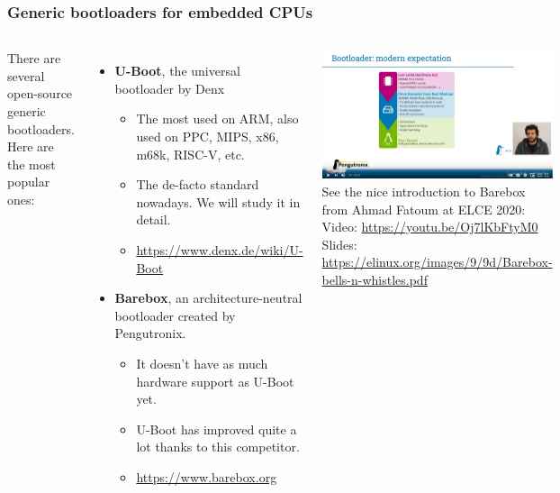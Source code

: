 \begin{frame}
  \frametitle{Generic bootloaders for embedded CPUs}
  \begin{columns}
  \small
  There are several open-source generic bootloaders.\\
  Here are the most popular ones:
  \begin{itemize}
  \item {\bf U-Boot}, the universal bootloader by Denx
      \begin{itemize}
        \item The most used on ARM, also used on PPC, MIPS, x86, m68k, RISC-V, etc.
        \item The de-facto standard nowadays. We will study it in detail.
         \item \url{https://www.denx.de/wiki/U-Boot}
      \end{itemize}
  \item {\bf Barebox}, an architecture-neutral bootloader created by Pengutronix.
      \begin{itemize}
        \item It doesn't have as much hardware support as U-Boot yet.
	\item U-Boot has improved quite a lot thanks to this competitor.
        \item \url{https://www.barebox.org}
      \end{itemize}
  \end{itemize}
    \vspace{2cm}
    \includegraphics[width=\textwidth]{slides/sysdev-bootloaders-sequence/barebox-video.jpg}\\
    \vspace{0.3cm}
    \tiny See the nice introduction to Barebox\\
	  from Ahmad Fatoum at ELCE 2020:\\
          Video: \url{https://youtu.be/Oj7lKbFtyM0}\\
	  Slides: \url{https://elinux.org/images/9/9d/Barebox-bells-n-whistles.pdf}
  \end{columns}
\end{frame}
